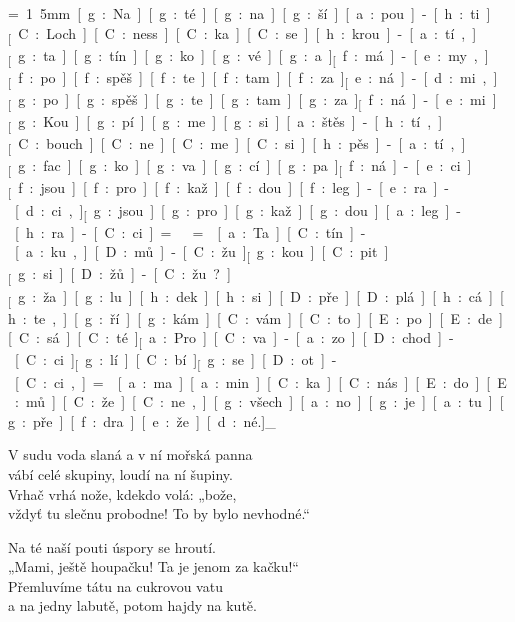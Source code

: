 {\unit=1.5mm
[g:Na] [g:té] [g:na][g:ší] [a:pou]-[h:ti]_
[C:Loch][C:ness][C:ka] [C:se] [h:krou]-[a:tí,]_

[g:ta][g:tín][g:ko][g:vé] [g:a]_ [f:má]-[e:my,]_
[f:po][f:spěš][f:te] [f:tam] [f:za]_ [e:ná]-[d:mi,]_

[g:po][g:spěš][g:te] [g:tam] [g:za]_ [f:ná]-[e:mi.]_

[g:Kou][g:pí][g:me] [g:si] [a:štěs]-[h:tí,]_
[C:bouch][C:ne][C:me] [C:si] [h:pěs]-[a:tí,]_

[g:fac][g:ko][g:va][g:cí] [g:pa]_ [f:ná]-[e:ci]_
[f:jsou] [f:pro] [f:kaž][f:dou] [f:leg]-[e:ra]-[d:ci,]_

[g:jsou] [g:pro] [g:kaž][g:dou] [a:leg]-[h:ra]-[C:ci.]_

\min=
\max=

[a:Ta][C:tín]-[a:ku,] [D:mů]-[C:žu]_
[g:kou][C:pit]_ [g:si] [D:žů]-[C:žu?]_

[g:ža][g:lu][h:dek] [h:si] [D:pře][D:plá][h:cá][h:te,] %
[g:ří][g:kám] [C:vám] [C:to] [E:po][E:de][C:sá][C:té.]_

[a:Pro][C:va]-[a:zo][D:chod]-[C:ci]_
[g:lí][C:bí]_ [g:se] [D:ot]-[C:ci,]_

\min=
[a:ma][a:min][C:ka] [C:nás] [E:do][E:mů] [C:že][C:ne,] %
[g:všech][a:no] [g:je] [a:tu] [g:pře][f:dra][e:že][d:né.]_
}

V sudu voda slaná a v ní mořská panna\\
vábí celé skupiny, loudí na ní šupiny.\\
Vrhač vrhá nože, kdekdo volá: „bože,\\
vždyť tu slečnu probodne! To by bylo nevhodné.“

Na té naší pouti úspory se hroutí.\\
„Mami, ještě houpačku! Ta je jenom za kačku!“\\
Přemluvíme tátu na cukrovou vatu\\
a na jedny labutě, potom hajdy na kutě.

\bye
